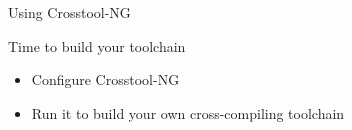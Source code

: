 \setuplabframe
{Using Crosstool-NG}
{
  Time to build your toolchain
  \begin{itemize}
  \item Configure Crosstool-NG
  \item Run it to build your own cross-compiling toolchain
  \end{itemize}
}
